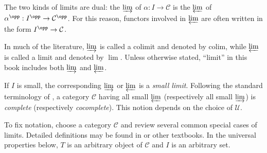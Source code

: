 The two kinds of limits are dual: the $\varinjlim$ of $\alpha:I\to\mathcal C$ is the $\varprojlim$ of $\alpha^{\opp}:I^{\opp}\to\mathcal C^{\opp}$. For this reason, functors involved in $\varprojlim$ are often written in the form $I^{\opp}\to\mathcal C$.

In much of the literature, $\varinjlim$ is called a colimit and denoted by $\mathrm{colim}$, while $\varprojlim$ is called a limit and denoted by $\lim$. Unless otherwise stated, ``limit'' in this book includes both $\varinjlim$ and $\varprojlim$.

If $I$ is small, the corresponding $\varinjlim$ or $\varprojlim$ is a \emph{small limit}. Following the standard terminology of \cite[\S~2.8]{Li1}, a category $\mathcal C$ having all small $\varprojlim$ (respectively all small $\varinjlim$) is \emph{complete} (respectively \emph{cocomplete}). This notion depends on the choice of $\mathcal U$.

To fix notation, choose a category $\mathcal C$ and review several common special cases of limits. Detailed definitions may be found in \cite[\S~2.7]{Li1} or other textbooks. In the universal properties below, $T$ is an arbitrary object of $\mathcal C$ and $I$ is an arbitrary set.

